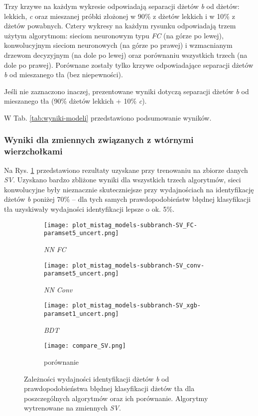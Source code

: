 Trzy krzywe na każdym wykresie odpowiadają separacji dżetów \textit{b} od dżetów: lekkich, \textit{c} oraz mieszanej próbki złożonej w 90\% z dżetów lekkich i w 10\% z dżetów powabnych.
Cztery wykresy na każdym rysunku odpowiadają trzem użytym algorytmom: sieciom neuronowym typu \textit{FC} (na górze po lewej), konwolucyjnym sieciom neuronowych (na górze po prawej) i wzmacnianym drzewom decyzyjnym (na dole po lewej) oraz porównaniu wszystkich trzech (na dole po prawej). Porównane zostały tylko krzywe odpowiadające separacji dżetów \textit{b} od mieszanego tła (bez niepewności).

Jeśli nie zaznaczono inaczej, prezentowane wyniki dotyczą separacji dżetów \textit{b} od mieszanego tła (90\% dżetów lekkich + 10\% \textit{c}).

W Tab. \ref{tab:wyniki-modeli} przedstawiono podsumowanie wyników.

\clearpage
\FloatBarrier
\subsubsection{Wyniki dla zmiennych związanych z wtórnymi wierzchołkami}

Na Rys. \ref{fig:ROC_SV} przedstawiono rezultaty uzyskane przy trenowaniu na zbiorze danych \textit{SV}. Uzyskano bardzo zbliżone wyniki dla wszystkich trzech algorytmów, sieci konwolucyjne były nieznacznie skuteczniejsze przy wydajnościach na identyfikację dżetów \textit{b} poniżej 70\% -- dla tych samych prawdopodobieństw błędnej klasyfikacji tła uzyskiwały wydajności identyfikacji lepsze o ok. 5\%.

\begin{figure}[ht]
	\centering
    \begin{subfigure}[b]{0.49\textwidth}
	\texttt{[image: plot\_mistag\_models-subbranch-SV\_FC-paramset5\_uncert.png]}
	\caption{\textit{NN FC}}
	\end{subfigure}
    \begin{subfigure}[b]{0.49\textwidth}
	\texttt{[image: plot\_mistag\_models-subbranch-SV\_conv-paramset5\_uncert.png]}	
	\caption{\textit{NN Conv}}
	\end{subfigure}
    \begin{subfigure}[b]{0.49\textwidth}
	\texttt{[image: plot\_mistag\_models-subbranch-SV\_xgb-paramset1\_uncert.png]}
	\caption{\textit{BDT}}
	\end{subfigure}
	\begin{subfigure}[b]{0.49\textwidth}
	\texttt{[image: compare\_SV.png]}
	\caption{porównanie}
	\end{subfigure}	
	
	\caption{Zależności wydajności identyfikacji dżetów \textit{b} od prawdopodobieństwa błędnej klasyfikacji dżetów tła dla poszczególnych algorytmów oraz ich porównanie. Algorytmy wytrenowane na zmiennych \textit{SV}.}
	\label{fig:ROC_SV}
\end{figure}



